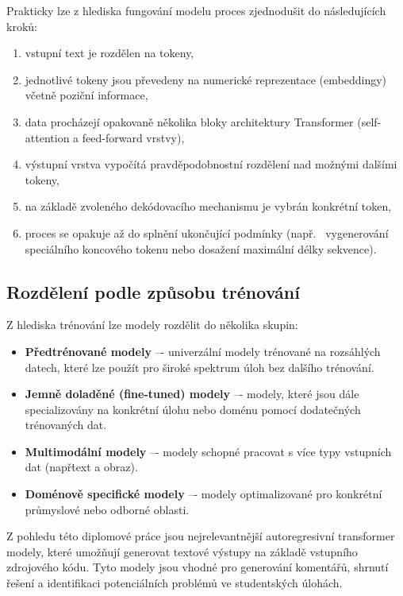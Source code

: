 Prakticky lze z hlediska fungování modelu proces zjednodušit do následujících kroků:

\begin{enumerate}
    \item vstupní text je rozdělen na tokeny,
    \item jednotlivé tokeny jsou převedeny na numerické reprezentace (embeddingy) včetně poziční informace,
    \item data procházejí opakovaně několika bloky architektury Transformer (self-attention a feed-forward vrstvy),
    \item výstupní vrstva vypočítá pravděpodobnostní rozdělení nad možnými dalšími tokeny,
    \item na základě zvoleného dekódovacího mechanismu je vybrán konkrétní token,
    \item proces se opakuje až do splnění ukončující podmínky (např.~ vygenerování speciálního koncového tokenu nebo dosažení maximální délky sekvence).
\end{enumerate}

\subsection*{Rozdělení podle způsobu trénování}
\label{subsec:llm-training-types}

Z hlediska trénování lze modely rozdělit do několika skupin:

\begin{itemize}
    \item \textbf{Předtrénované modely} –- univerzální modely trénované na rozsáhlých datech, které lze použít pro široké spektrum úloh bez dalšího trénování.
    \item \textbf{Jemně doladěné (fine-tuned) modely} –- modely, které jsou dále specializovány na konkrétní úlohu nebo doménu pomocí dodatečných trénovaných dat.
    \item \textbf{Multimodální modely} –- modely schopné pracovat s více typy vstupních dat (např\. text a obraz).
    \item \textbf{Doménově specifické modely} –- modely optimalizované pro konkrétní průmyslové nebo odborné oblasti.
\end{itemize}

Z pohledu této diplomové práce jsou nejrelevantnější autoregresivní transformer modely, které umožňují generovat textové výstupy na základě vstupního zdrojového kódu.
Tyto modely jsou vhodné pro generování komentářů, shrnutí řešení a identifikaci potenciálních problémů ve studentských úlohách.

\endinput